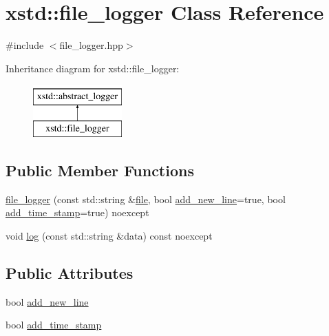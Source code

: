 \hypertarget{classxstd_1_1file__logger}{\section{xstd\-:\-:file\-\_\-logger Class Reference}
\label{classxstd_1_1file__logger}
}


{\ttfamily \#include $<$file\-\_\-logger.\-hpp$>$}

Inheritance diagram for xstd\-:\-:file\-\_\-logger\-:\begin{figure}[H]
\begin{center}
\leavevmode
\includegraphics[height=2.000000cm]{classxstd_1_1file__logger}
\end{center}
\end{figure}
\subsection*{Public Member Functions}
\begin{DoxyCompactItemize}
\item 
\hyperlink{classxstd_1_1file__logger_a6e43dc8871b62e45550ce6470dcf5477}{file\-\_\-logger} (const std\-::string \&\hyperlink{classxstd_1_1file__logger_a0745eaab93df733f6696fa14e74eb068}{file}, bool \hyperlink{classxstd_1_1abstract__logger_a5216ec0a18fea2571db19d5a55d8700f}{add\-\_\-new\-\_\-line}=true, bool \hyperlink{classxstd_1_1abstract__logger_a534b4f6a3dcdd3b7f18abfcb1bb5b937}{add\-\_\-time\-\_\-stamp}=true) noexcept
\item 
void \hyperlink{classxstd_1_1abstract__logger_ad470970ac4726355f3423017f434ace8}{log} (const std\-::string \&data) const noexcept
\end{DoxyCompactItemize}
\subsection*{Public Attributes}
\begin{DoxyCompactItemize}
\item 
bool \hyperlink{classxstd_1_1abstract__logger_a5216ec0a18fea2571db19d5a55d8700f}{add\-\_\-new\-\_\-line}
\item 
bool \hyperlink{classxstd_1_1abstract__logger_a534b4f6a3dcdd3b7f18abfcb1bb5b937}{add\-\_\-time\-\_\-stamp}
\end{DoxyCompactItemize}
